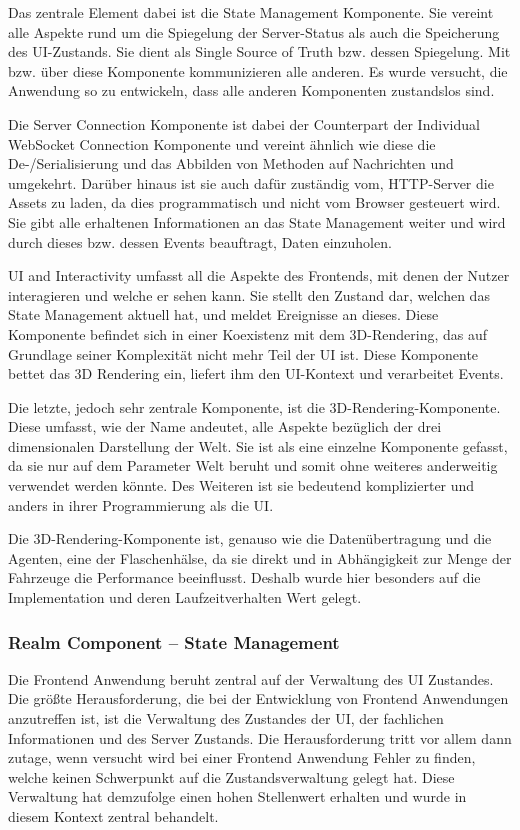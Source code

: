 Das zentrale Element dabei ist die State Management Komponente.
Sie vereint alle Aspekte rund um die Spiegelung der Server-Status als auch die Speicherung des UI-Zustands.
Sie dient als Single Source of Truth bzw. dessen Spiegelung.
Mit bzw. über diese Komponente kommunizieren alle anderen.
Es wurde versucht, die Anwendung so zu entwickeln, dass alle anderen Komponenten zustandslos sind.

Die Server Connection Komponente ist dabei der Counterpart der Individual WebSocket Connection Komponente und vereint ähnlich wie diese die De-/Serialisierung und das Abbilden von Methoden auf Nachrichten und umgekehrt.
Darüber hinaus ist sie auch dafür zuständig vom, HTTP-Server die Assets zu laden, da dies programmatisch und nicht vom Browser gesteuert wird.
Sie gibt alle erhaltenen Informationen an das State Management weiter und wird durch dieses bzw. dessen Events beauftragt, Daten einzuholen.

UI and Interactivity umfasst all die Aspekte des Frontends, mit denen der Nutzer interagieren und welche er sehen kann.
Sie stellt den Zustand dar, welchen das State Management aktuell hat, und meldet Ereignisse an dieses.
Diese Komponente befindet sich in einer Koexistenz mit dem 3D-Rendering, das auf Grundlage seiner Komplexität nicht mehr Teil der UI ist.
Diese Komponente bettet das 3D Rendering ein, liefert ihm den UI-Kontext und verarbeitet Events.

Die letzte, jedoch sehr zentrale Komponente, ist die 3D-Rendering-Kompo\-nente.
Diese umfasst, wie der Name andeutet, alle Aspekte bezüglich der drei dimensionalen Darstellung der Welt.
Sie ist als eine einzelne Komponente gefasst, da sie nur auf dem Parameter Welt beruht und somit ohne weiteres anderweitig verwendet werden könnte.
Des Weiteren ist sie bedeutend komplizierter und anders in ihrer Programmierung als die UI.

Die 3D-Rendering-Komponente ist, genauso wie die Datenübertragung und die Agenten, eine der Flaschenhälse, da sie direkt und in Abhängigkeit zur Menge der Fahrzeuge die Performance beeinflusst.
Deshalb wurde hier besonders auf die Implementation und deren Laufzeitverhalten Wert gelegt.

\FloatBarrier

\subsubsection{Realm Component – State Management}

Die Frontend Anwendung beruht zentral auf der Verwaltung des UI Zustandes.
Die größte Herausforderung, die bei der Entwicklung von Frontend Anwendungen anzutreffen ist, ist die Verwaltung des Zustandes der UI, der fachlichen Informationen und des Server Zustands.
Die Herausforderung tritt vor allem dann zutage, wenn versucht wird bei einer Frontend Anwendung Fehler zu finden, welche keinen Schwerpunkt auf die Zustandsverwaltung gelegt hat.
Diese Verwaltung hat demzufolge einen hohen Stellenwert erhalten und wurde in diesem Kontext zentral behandelt.

